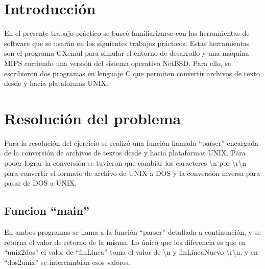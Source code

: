\documentclass[a4paper,10pt]{article}
\begin{document}

\setcounter{page}{2}

\newpage
\thispagestyle{empty}
\tableofcontents

\newpage
\section{Introducci\'on}

En el presente trabajo pr\'actico se busc\'o familiarizarse con las
herramientas de software que se usar\'an en los siguientes trabajos
pr\'acticos. Estas herramientas son el programa GXemul para simular el
entorno de desarrollo y una m\'aquina MIPS corriendo una versi\'on del
sistema operativo NetBSD. Para ello, se escribieron dos programas en
lenguaje C que permiten convertir archivos de texto desde y hacia
plataformas UNIX. 

\section{Resoluci\'on del problema}
Para la resoluci\'on del ejercicio se realiz\'o una funci\'on llamada
``parser'' encargada de la conversi\'on de archivos de textos desde y hacia 
plataformas UNIX. Para poder lograr la conversi\'on se tuvieron que cambiar los caracteres
\textbackslash n por \textbackslash r\textbackslash n para convertir el formato de archivo de UNIX a DOS y la conversi\'on 
inversa para pasar de DOS a UNIX. 

  \subsection{Funcion ``main''}
  En ambos programas se llama a la funci\'on ``parser'' detallada a continuaci\'on, y se retorna el valor de 
  retorno de la misma. Lo \'unico que los diferencia es que en ``unix2dos'' el valor de ``finLinea'' toma el 
  valor de \textbackslash n y finLineaNuevo \textbackslash r\textbackslash n, y en ``dos2unix'' se 
  intercambian esos valores.
\end{document}
